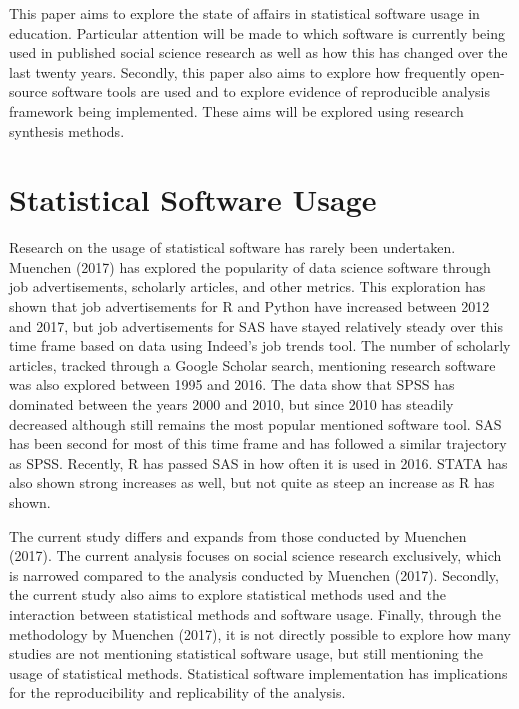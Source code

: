 \documentclass[english,,man]{apa6}
\begin{document}
This paper aims to explore the state of affairs in statistical software usage in education. Particular attention will be made to which software is currently being used in published social science research as well as how this has changed over the last twenty years. Secondly, this paper also aims to explore how frequently open-source software tools are used and to explore evidence of reproducible analysis framework being implemented. These aims will be explored using research synthesis methods.

\hypertarget{statistical-software-usage}{%
\section{Statistical Software Usage}\label{statistical-software-usage}}

Research on the usage of statistical software has rarely been undertaken. Muenchen (2017) has explored the popularity of data science software through job advertisements, scholarly articles, and other metrics. This exploration has shown that job advertisements for R and Python have increased between 2012 and 2017, but job advertisements for SAS have stayed relatively steady over this time frame based on data using Indeed's job trends tool. The number of scholarly articles, tracked through a Google Scholar search, mentioning research software was also explored between 1995 and 2016. The data show that SPSS has dominated between the years 2000 and 2010, but since 2010 has steadily decreased although still remains the most popular mentioned software tool. SAS has been second for most of this time frame and has followed a similar trajectory as SPSS. Recently, R has passed SAS in how often it is used in 2016. STATA has also shown strong increases as well, but not quite as steep an increase as R has shown.

The current study differs and expands from those conducted by Muenchen (2017). The current analysis focuses on social science research exclusively, which is narrowed compared to the analysis conducted by Muenchen (2017). Secondly, the current study also aims to explore statistical methods used and the interaction between statistical methods and software usage. Finally, through the methodology by Muenchen (2017), it is not directly possible to explore how many studies are not mentioning statistical software usage, but still mentioning the usage of statistical methods. Statistical software implementation has implications for the reproducibility and replicability of the analysis.
\end{document}
